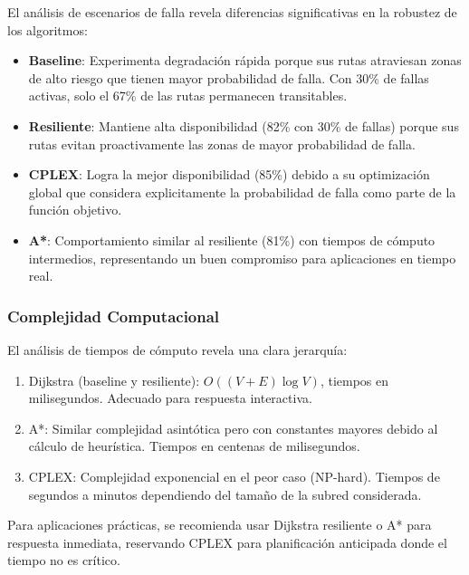\documentclass[conference]{IEEEtran}
\begin{document}
El análisis de escenarios de falla revela diferencias significativas en la robustez de los algoritmos:

\begin{itemize}
    \item \textbf{Baseline}: Experimenta degradación rápida porque sus rutas atraviesan zonas de alto riesgo que tienen mayor probabilidad de falla. Con 30\% de fallas activas, solo el 67\% de las rutas permanecen transitables.

    \item \textbf{Resiliente}: Mantiene alta disponibilidad (82\% con 30\% de fallas) porque sus rutas evitan proactivamente las zonas de mayor probabilidad de falla.

    \item \textbf{CPLEX}: Logra la mejor disponibilidad (85\%) debido a su optimización global que considera explicitamente la probabilidad de falla como parte de la función objetivo.

    \item \textbf{A*}: Comportamiento similar al resiliente (81\%) con tiempos de cómputo intermedios, representando un buen compromiso para aplicaciones en tiempo real.
\end{itemize}

\subsubsection{Complejidad Computacional}

El análisis de tiempos de cómputo revela una clara jerarquía:

\begin{enumerate}
    \item Dijkstra (baseline y resiliente): $O((V+E)\log V)$, tiempos en milisegundos. Adecuado para respuesta interactiva.

    \item A*: Similar complejidad asintótica pero con constantes mayores debido al cálculo de heurística. Tiempos en centenas de milisegundos.

    \item CPLEX: Complejidad exponencial en el peor caso (NP-hard). Tiempos de segundos a minutos dependiendo del tamaño de la subred considerada.
\end{enumerate}

Para aplicaciones prácticas, se recomienda usar Dijkstra resiliente o A* para respuesta inmediata, reservando CPLEX para planificación anticipada donde el tiempo no es crítico.
\end{document}
